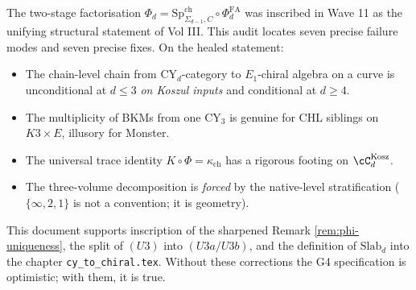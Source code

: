 \documentclass[11pt]{article}
\theoremstyle{definition}
\providecommand{\PhiFA}{\Phi^{\mathrm{FA}}}
\providecommand{\SpCh}{\mathrm{Sp}^{\mathrm{ch}}}
\providecommand{\Eone}{E_1}
\providecommand{\kch}{\kappa_{\mathrm{ch}}}
\begin{document}
The two-stage factorisation
$\Phi_d = \SpCh_{\Sigma_{d-1}, C} \circ \PhiFA_d$ was inscribed in
Wave 11 as the unifying structural statement of Vol III. This audit
locates seven precise failure modes and seven precise fixes. On the
healed statement:

\begin{itemize}[leftmargin=*]
\item The chain-level chain from CY$_d$-category to $\Eone$-chiral
algebra on a curve is unconditional at $d \leq 3$ \emph{on Koszul
inputs} and conditional at $d \geq 4$.
\item The multiplicity of BKMs from one CY$_3$ is genuine for CHL
siblings on $K3 \times E$, illusory for Monster.
\item The universal trace identity $K \circ \Phi = \kch$ has a rigorous
footing on $\cC_d^{\mathrm{Kosz}}$.
\item The three-volume decomposition is \emph{forced} by the native-level
stratification ($\{\infty, 2, 1\}$ is not a convention; it is geometry).
\end{itemize}

This document supports inscription of the sharpened Remark
\ref{rem:phi-uniqueness}, the split of $(U3)$ into $(U3a/U3b)$, and
the definition of $\mathrm{Slab}_d$ into the chapter
\texttt{cy\_to\_chiral.tex}. Without these corrections the G4
specification is optimistic; with them, it is true.
\end{document}
